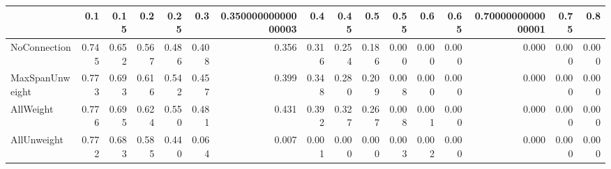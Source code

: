 \begin{tabular}{lrrrrrrrrrrrrrrr}
\toprule
{} &   0.1 &  0.15 &   0.2 &  0.25 &   0.3 & 0.35000000000000003 &   0.4 &  0.45 &   0.5 &  0.55 &   0.6 &  0.65 & 0.7000000000000001 &  0.75 &   0.8 \\
\midrule
NoConnection    & 0.745 & 0.652 & 0.567 & 0.486 & 0.408 &               0.356 & 0.316 & 0.254 & 0.186 & 0.000 & 0.000 & 0.000 &              0.000 & 0.000 & 0.000 \\
MaxSpanUnweight & 0.773 & 0.693 & 0.616 & 0.542 & 0.457 &               0.399 & 0.348 & 0.280 & 0.209 & 0.008 & 0.000 & 0.000 &              0.000 & 0.000 & 0.000 \\
AllWeight       & 0.776 & 0.695 & 0.624 & 0.550 & 0.481 &               0.431 & 0.392 & 0.327 & 0.267 & 0.008 & 0.001 & 0.000 &              0.000 & 0.000 & 0.000 \\
AllUnweight     & 0.772 & 0.683 & 0.585 & 0.440 & 0.064 &               0.007 & 0.001 & 0.000 & 0.000 & 0.003 & 0.002 & 0.000 &              0.000 & 0.000 & 0.000 \\
\bottomrule
\end{tabular}
